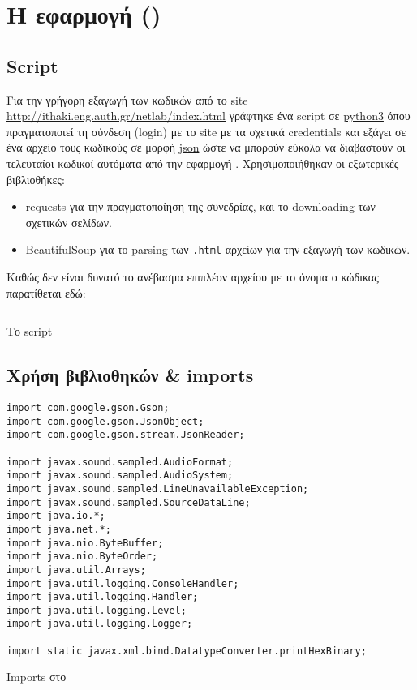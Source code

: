 \newcommand{\codeRef}[2][]{\hyperref[section:#2]{\texttt!#2#1!}}
\chapter{Η εφαρμογή (\appname{})}
\section{Script \scriptname{}}
Για την γρήγορη εξαγωγή των κωδικών από το site \url{http://ithaki.eng.auth.gr/netlab/index.html} γράφτηκε ένα script σε
\href{https://www.python.org/}{python3}
όπου πραγματοποιεί τη σύνδεση (login) με το site με τα σχετικά credentials και εξάγει σε ένα αρχείο τους κωδικούς σε μορφή
\href{https://en.wikipedia.org/wiki/JSON}{json} ώστε να μπορούν εύκολα να διαβαστούν οι τελευταίοι κωδικοί αυτόματα από την εφαρμογή \appname{}.
Χρησιμοποιήθηκαν οι εξωτερικές βιβλιοθήκες:
\begin{itemize}
\item \href{http://docs.python-requests.org/en/master/}{requests} για την πραγματοποίηση της συνεδρίας, και το downloading των σχετικών σελίδων.
\item \href{http://www.crummy.com/software/BeautifulSoup/}{BeautifulSoup} για το parsing των \texttt{.html} αρχείων για την εξαγωγή των κωδικών.
\end{itemize}

Καθώς δεν είναι δυνατό το ανέβασμα επιπλέον αρχείου με το όνομα \scriptname{} ο κώδικας παρατίθεται εδώ:
\begin{code}
\inputminted[frame=single, breaklines=true, linenos=true, python3=true]{python}{../extract-codes.py}
\caption{Το script \scriptname{}}
\label{listing:extract-codes}
\end{code}

\section{Χρήση βιβλιοθηκών \& imports}
\begin{code}
\begin{verbatim}
import com.google.gson.Gson;
import com.google.gson.JsonObject;
import com.google.gson.stream.JsonReader;

import javax.sound.sampled.AudioFormat;
import javax.sound.sampled.AudioSystem;
import javax.sound.sampled.LineUnavailableException;
import javax.sound.sampled.SourceDataLine;
import java.io.*;
import java.net.*;
import java.nio.ByteBuffer;
import java.nio.ByteOrder;
import java.util.Arrays;
import java.util.logging.ConsoleHandler;
import java.util.logging.Handler;
import java.util.logging.Level;
import java.util.logging.Logger;

import static javax.xml.bind.DatatypeConverter.printHexBinary;
\end{verbatim}
\caption{Imports στο \appname}
\end{code}


